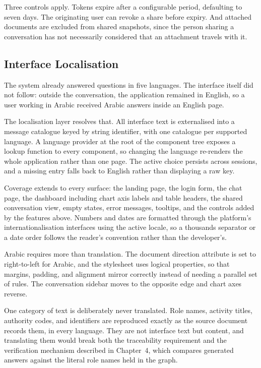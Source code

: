 Three controls apply. Tokens expire after a configurable period, defaulting to seven days. The originating user can revoke a share before expiry. And attached documents are excluded from shared snapshots, since the person sharing a conversation has not necessarily considered that an attachment travels with it.

\subsection{Interface Localisation}

The system already answered questions in five languages. The interface itself did not follow: outside the conversation, the application remained in English, so a user working in Arabic received Arabic answers inside an English page.

The localisation layer resolves that. All interface text is externalised into a message catalogue keyed by string identifier, with one catalogue per supported language. A language provider at the root of the component tree exposes a lookup function to every component, so changing the language re-renders the whole application rather than one page. The active choice persists across sessions, and a missing entry falls back to English rather than displaying a raw key.

Coverage extends to every surface: the landing page, the login form, the chat page, the dashboard including chart axis labels and table headers, the shared conversation view, empty states, error messages, tooltips, and the controls added by the features above. Numbers and dates are formatted through the platform's internationalisation interfaces using the active locale, so a thousands separator or a date order follows the reader's convention rather than the developer's.

Arabic requires more than translation. The document direction attribute is set to right-to-left for Arabic, and the stylesheet uses logical properties, so that margins, padding, and alignment mirror correctly instead of needing a parallel set of rules. The conversation sidebar moves to the opposite edge and chart axes reverse.

One category of text is deliberately never translated. Role names, activity titles, authority codes, and identifiers are reproduced exactly as the source document records them, in every language. They are not interface text but content, and translating them would break both the traceability requirement and the verification mechanism described in Chapter~4, which compares generated answers against the literal role names held in the graph.

